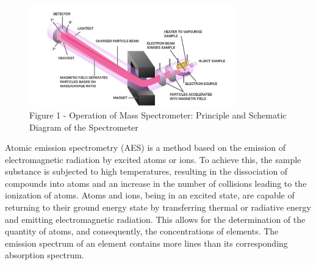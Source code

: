 \begin{figure}[H]
	\centering
	\includegraphics[width=0.8\textwidth]{assets/1049}
	\caption*{Figure 1 - Operation of Mass Spectrometer: Principle and Schematic Diagram of the Spectrometer}
\end{figure}

\begin{multicols}{2}
Atomic emission spectrometry (AES) is a method based on the emission of
electromagnetic radiation by excited atoms or ions. To achieve this, the
sample substance is subjected to high temperatures, resulting in the
dissociation of compounds into atoms and an increase in the number of
collisions leading to the ionization of atoms. Atoms and ions, being in
an excited state, are capable of returning to their ground energy state
by transferring thermal or radiative energy and emitting electromagnetic
radiation. This allows for the determination of the quantity of atoms,
and consequently, the concentrations of elements. The emission spectrum
of an element contains more lines than its corresponding absorption
spectrum.


\end{multicols}
